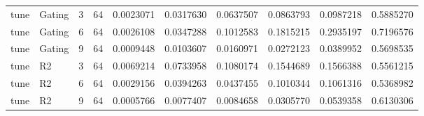 \begin{tabular}{llrrrrrrrr}
tune & Gating & 3 & 64 & 0.0023071 & 0.0317630 & 0.0637507 & 0.0863793 & 0.0987218 & 0.5885270 \\
tune & Gating & 6 & 64 & 0.0026108 & 0.0347288 & 0.1012583 & 0.1815215 & 0.2935197 & 0.7196576 \\
tune & Gating & 9 & 64 & 0.0009448 & 0.0103607 & 0.0160971 & 0.0272123 & 0.0389952 & 0.5698535 \\
tune & R2 & 3 & 64 & 0.0069214 & 0.0733958 & 0.1080174 & 0.1544689 & 0.1566388 & 0.5561215 \\
tune & R2 & 6 & 64 & 0.0029156 & 0.0394263 & 0.0437455 & 0.1010344 & 0.1061316 & 0.5368982 \\
tune & R2 & 9 & 64 & 0.0005766 & 0.0077407 & 0.0084658 & 0.0305770 & 0.0539358 & 0.6130306 \\
\bottomrule
\end{tabular}
